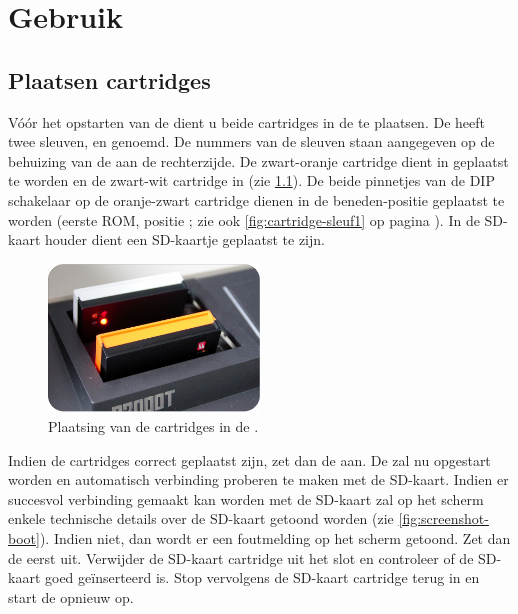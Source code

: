 \chapter{Gebruik}
\chapterpreamble

\label{chap:usage}

%
%
%
\section{Plaatsen cartridges}

Vóór het opstarten van de \pc dient u beide cartridges in de \pc te plaatsen. De \pc heeft twee sleuven,  en  genoemd. De nummers van de sleuven staan aangegeven op de behuizing van de \pc aan de rechterzijde. De zwart-oranje cartridge dient in  geplaatst te worden en de zwart-wit cartridge in  (zie \cref{fig:placement-cartridges}). De beide pinnetjes van de DIP schakelaar op de oranje-zwart cartridge dienen in de beneden-positie geplaatst te worden (eerste ROM, positie ; zie ook \cref{fig:cartridge-sleuf1} op pagina \pageref{fig:cartridge-sleuf1}). In de SD-kaart houder dient een SD-kaartje geplaatst te zijn.

\begin{figure}[h!]
    \centering
    \includegraphics[width=0.50\textwidth]{img/placement-cartridges.png}
    \caption{Plaatsing van de cartridges in de \pc.}
    \label{fig:placement-cartridges}
\end{figure}

Indien de cartridges correct geplaatst zijn, zet dan de \pc aan. De \launcher zal nu opgestart worden en automatisch verbinding proberen te maken met de SD-kaart. Indien er succesvol verbinding gemaakt kan worden met de SD-kaart zal op het scherm enkele technische details over de SD-kaart getoond worden (zie \cref{fig:screenshot-boot}). Indien niet, dan wordt er een foutmelding op het scherm getoond. Zet dan de \pc eerst uit. Verwijder de SD-kaart cartridge uit het slot en controleer of de SD-kaart goed geïnserteerd is. Stop vervolgens de SD-kaart cartridge terug in  en start de \pc opnieuw op.

